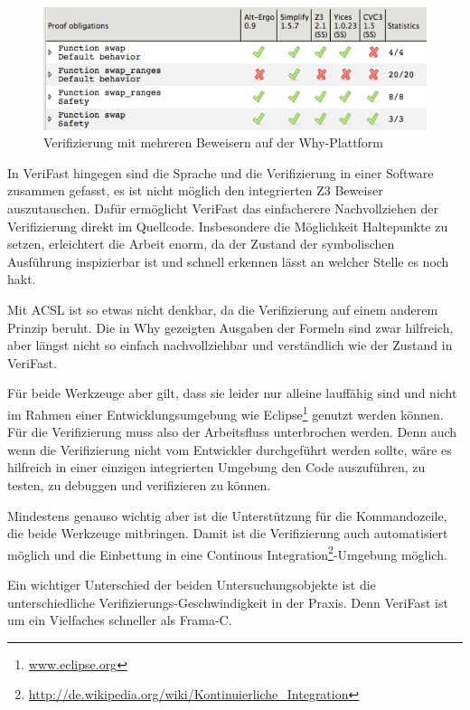 {\begin{figure}[H]
	\centering
\includegraphics[width=1.0\textwidth]{images/why-multiple-provers.png}
\caption{Verifizierung mit mehreren Beweisern auf der Why-Plattform}
\end{figure}

In VeriFast hingegen sind die Sprache und die Verifizierung in einer Software zusammen gefasst,
es ist nicht möglich den integrierten Z3 Beweiser auszutauschen. Dafür ermöglicht VeriFast das
einfacherere Nachvollziehen der Verifizierung direkt im Quellcode. Insbesondere die Möglichkeit
Haltepunkte zu setzen, erleichtert die Arbeit enorm, da der Zustand der symbolischen Ausführung
inspizierbar ist und schnell erkennen lässt an welcher Stelle es noch hakt.

Mit ACSL ist so etwas nicht denkbar, da die Verifizierung auf einem anderem Prinzip beruht. Die
in Why gezeigten Ausgaben der Formeln sind zwar hilfreich, aber längst nicht so einfach nachvollziehbar und
verständlich wie der Zustand in VeriFast.

Für beide Werkzeuge aber gilt, dass sie leider nur alleine lauffähig sind und nicht im Rahmen
einer Entwicklungsumgebung wie Eclipse\footnote{\url{www.eclipse.org}} genutzt werden können. 
Für die Verifizierung muss also der Arbeitsfluss unterbrochen werden. Denn auch wenn die Verifizierung
nicht vom Entwickler durchgeführt werden sollte, wäre es hilfreich in einer einzigen integrierten Umgebung
den Code auszuführen, zu testen, zu debuggen und verifizieren zu können.

Mindestens genauso wichtig aber ist die Unterstützung für die Kommandozeile, die beide Werkzeuge
mitbringen. Damit ist die Verifizierung auch automatisiert möglich und die Einbettung in eine
Continous Integration\footnote{\url{http://de.wikipedia.org/wiki/Kontinuierliche_Integration}}-Umgebung möglich.

Ein wichtiger Unterschied der beiden Untersuchungsobjekte ist die unterschiedliche Verifizierungs-Geschwindigkeit
in der Praxis. Denn VeriFast ist um ein Vielfaches schneller\cite[Kap. 3]{jac10-1} als Frama-C. 

}
